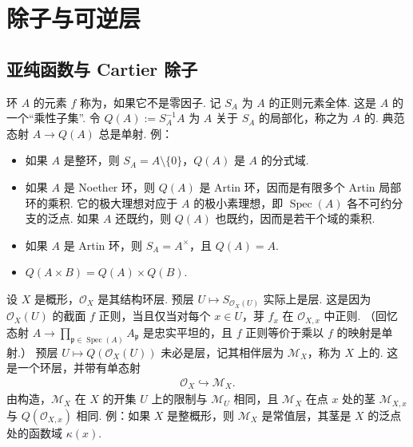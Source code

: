 \chapter{除子与可逆层}\label{chap:ag-1}
\section{亚纯函数与 Cartier 除子}\label{sec:ag-1-1}
\begin{numpara}[全分式环]\label{item:ag-1-1-1}
环 $A$ 的元素 $f$ 称为，如果它不是零因子. 记 $S_A$ 为 $A$ 的正则元素全体. 这是 $A$ 的一个``乘性子集''. 令 $Q(A):=S_A^{-1}A$ 为 $A$ 关于 $S_A$ 的局部化，称之为 $A$ 的.
典范态射 $A\longrightarrow Q(A)$ 总是单射.
例：
\begin{itemize}
\item 如果 $A$ 是整环，则 $S_A=A\setminus\{0\}$，$Q(A)$ 是 $A$ 的分式域.
\item 如果 $A$ 是 Noether 环，则 $Q(A)$ 是 Artin 环，因而是有限多个 Artin 局部环的乘积. 它的极大理想对应于 $A$ 的极小素理想，即 $\operatorname{Spec}(A)$ 各不可约分支的泛点. 如果 $A$ 还既约，则 $Q(A)$ 也既约，因而是若干个域的乘积.
\item 如果 $A$ 是 Artin 环，则 $S_A=A^\times$，且 $Q(A)=A$.
\item $Q(A\times B)=Q(A)\times Q(B)$.
\end{itemize}
\end{numpara}
\begin{numpara}[亚纯函数层]\label{item:ag-1-1-2}
设 $X$ 是概形，$\mathcal O_X$ 是其结构环层. 预层 $U\mapsto S_{\mathcal O_X(U)}$ 实际上是层. 这是因为 $\mathcal O_X(U)$ 的截面 $f$ 正则，当且仅当对每个 $x\in U$，芽 $f_x$ 在 $\mathcal O_{X,x}$ 中正则. （回忆态射 $A\longrightarrow\prod_{\mathfrak p\in\operatorname{Spec}(A)}A_{\mathfrak p}$ 是忠实平坦的，且 $f$ 正则等价于乘以 $f$ 的映射是单射.）
预层 $U\mapsto Q(\mathcal O_X(U))$ 未必是层，记其相伴层为 $\mathcal M_X$，称为 $X$ 上的. 这是一个环层，并带有单态射
\begin{align*}
\mathcal O_X\hookrightarrow\mathcal M_X.
\end{align*}
由构造，$\mathcal M_X$ 在 $X$ 的开集 $U$ 上的限制与 $\mathcal M_U$ 相同，且 $\mathcal M_X$ 在点 $x$ 处的茎 $\mathcal M_{X,x}$ 与 $Q(\mathcal O_{X,x})$ 相同.
例：如果 $X$ 是整概形，则 $\mathcal M_X$ 是常值层，其茎是 $X$ 的泛点处的函数域 $\kappa(x)$.
\end{numpara}
